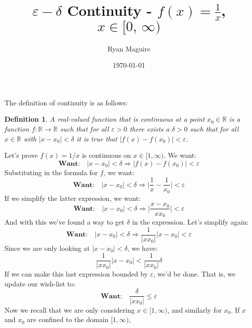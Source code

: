 \documentclass{article}
\title{$\varepsilon-\delta$ Continuity - $f(x)=\frac{1}{x}$, $x\in[0,\,\infty)$}
\author{Ryan Maguire}
\date{\today}
\theoremstyle{normal}
\newtheorem{definition}{Definition}
\begin{document}
    \maketitle
    The definition of continuity is as follows:
    \begin{definition}
        A real-valued function that is continuous at a point
        $x_{0}\in\mathbb{R}$ is a function $f:\mathbb{R}\rightarrow\mathbb{R}$
        such that for all $\varepsilon>0$ there exists a $\delta>0$ such that
        for all $x\in\mathbb{R}$ with $|x-x_{0}|<\delta$ it is true that
        $|f(x)-f(x_{0})|<\varepsilon$.
    \end{definition}
    Let's prove $f(x)=1/x$ is continuous on $x\in[1,\infty)$. We want:
    \begin{equation}
        \textbf{Want:}\quad
        |x-x_{0}|<\delta
        \Rightarrow|f(x)-f(x_{0})|<\varepsilon
    \end{equation}
    Substituting in the formula for $f$, we want:
    \begin{equation}
        \textbf{Want:}\quad
        |x-x_{0}|<\delta
        \Rightarrow
        \big|\frac{1}{x}-\frac{1}{x_{0}}\big|<\varepsilon
    \end{equation}
    If we simplify the latter expression, we want:
    \begin{equation}
        \textbf{Want:}\quad
        |x-x_{0}|<\delta
        \Rightarrow
        \big|\frac{x-x_{0}}{xx_{0}}\big|<\varepsilon
    \end{equation}
    And with this we've found a way to get $\delta$ in the expression. Let's
    simplify again:
    \begin{equation}
        \textbf{Want:}\quad
        |x-x_{0}|<\delta
        \Rightarrow
        \frac{1}{|xx_{0}|}|x-x_{0}|<\varepsilon
    \end{equation}
    Since we are only looking at $|x-x_{0}|<\delta$, we have:
    \begin{equation}
        \frac{1}{|xx_{0}|}|x-x_{0}|<\frac{1}{|xx_{0}|}\delta
    \end{equation}
    If we can make this last expression bounded by $\varepsilon$, we'd be done.
    That is, we update our wish-list to:
    \begin{equation}
        \textbf{Want:}\quad
        \frac{\delta}{|xx_{0}|}\leq\varepsilon
    \end{equation}
    Now we recall that we are only considering $x\in[1,\infty)$, and similarly
    for $x_{0}$. If $x$ and $x_{0}$ are confined to the domain $[1,\infty)$,
\end{document}

